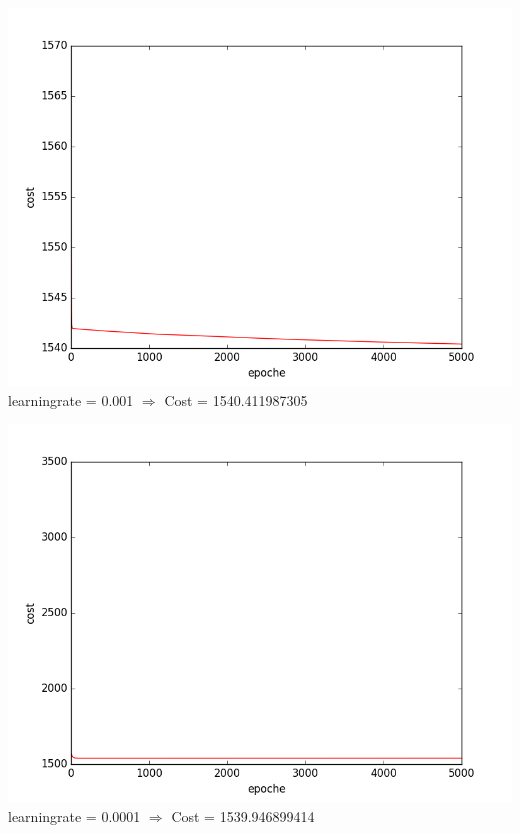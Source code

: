 \documentclass[12pt]{article}
\begin{document}
\begin{enumerate}[a)]
                \begin{center}
                    \includegraphics[scale = 0.52]{pictures/cost5000_w-20,0_b619,0_learn0,001}\\
                    learningrate = 0.001 $\Rightarrow$ Cost = 1540.411987305\\
                \end{center}

                \begin{center}
                    \includegraphics[scale = 0.52]{pictures/cost5000_w-20,0_b619,0_learn0,0001}\\
                    learningrate = 0.0001 $\Rightarrow$ Cost = 1539.946899414\\
                \end{center}


\end{enumerate}
\end{document}
